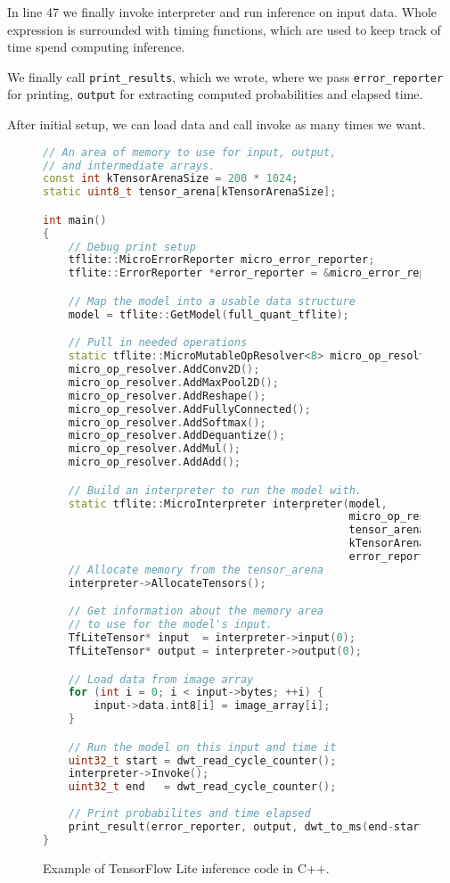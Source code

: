 In line 47 we finally invoke interpreter and run inference on input data.
Whole expression is surrounded with timing functions, which are used to keep track of time spend computing inference.

We finally call \verb|print_results|, which we wrote, where we pass \verb|error_reporter| for printing, \verb|output| for extracting computed probabilities and elapsed time.

After initial setup, we can load data and call invoke as many times we want.

\lstset{style=mystyle}

\begin{figure}[ht] 
    \begin{lstlisting}[language=C++]
// An area of memory to use for input, output, 
// and intermediate arrays.
const int kTensorArenaSize = 200 * 1024;
static uint8_t tensor_arena[kTensorArenaSize];

int main() 
{
    // Debug print setup
    tflite::MicroErrorReporter micro_error_reporter;
    tflite::ErrorReporter *error_reporter = &micro_error_reporter;

    // Map the model into a usable data structure
    model = tflite::GetModel(full_quant_tflite);

    // Pull in needed operations
    static tflite::MicroMutableOpResolver<8> micro_op_resolver;
    micro_op_resolver.AddConv2D();
    micro_op_resolver.AddMaxPool2D();
    micro_op_resolver.AddReshape();
    micro_op_resolver.AddFullyConnected();
    micro_op_resolver.AddSoftmax();
    micro_op_resolver.AddDequantize();
    micro_op_resolver.AddMul();
    micro_op_resolver.AddAdd();

    // Build an interpreter to run the model with.
    static tflite::MicroInterpreter interpreter(model, 
                                                micro_op_resolver, 
                                                tensor_arena,
                                                kTensorArenaSize, 
                                                error_reporter);
    // Allocate memory from the tensor_arena
    interpreter->AllocateTensors();

    // Get information about the memory area 
    // to use for the model's input.
    TfLiteTensor* input  = interpreter->input(0);
    TfLiteTensor* output = interpreter->output(0);

    // Load data from image array
    for (int i = 0; i < input->bytes; ++i) {
        input->data.int8[i] = image_array[i];
    }

    // Run the model on this input and time it
    uint32_t start = dwt_read_cycle_counter();
    interpreter->Invoke();
    uint32_t end   = dwt_read_cycle_counter();
    
    // Print probabilites and time elapsed
    print_result(error_reporter, output, dwt_to_ms(end-start));
}
    \end{lstlisting}
    \caption{ Example of TensorFlow Lite inference code in C++.}
    \label{inference_code}
\end{figure}


